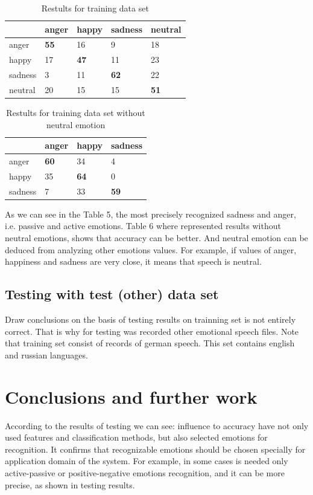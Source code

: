 \documentclass[12pt, letterpaper]{article}
\begin{document}
\begin{table}
	\centering
	\begin{tabular}{|l|l|l|l|l|}
		\hline
		&anger&happy&sadness&neutral\\ \hline
		anger&\textbf{55}&16&9&18\\\hline
		happy & 17 & \textbf{47} & 11 & 23 \\\hline
		sadness & 3 & 11 & \textbf{62} & 22\\\hline
		neutral & 20 & 15 & 15 & \textbf{51}\\\hline
		
	\end{tabular}
	\caption{Restults for training data set}
\end{table}
\begin{table}[h]
	\centering
	\begin{tabular}{|l|l|l|l|}
		\hline
		&anger&happy&sadness\\ \hline
		anger&\textbf{60}&34&4\\\hline
		happy & 35 & \textbf{64} & 0\\\hline
		sadness & 7 & 33& \textbf{59}\\\hline
		
	\end{tabular}
	\caption{Restults for training data set without neutral emotion}
\end{table}
As we can see in the Table 5, the most precisely recognized sadness and anger, i.e. passive and active emotions. Table 6 where represented results without neutral emotions, shows that accuracy can be better. And neutral emotion can be deduced from analyzing other emotions values. For example, if values of anger, happiness and sadness are very close, it means that speech is neutral.

\subsection{Testing with test (other) data set}
Draw conclusions on the basis of testing results on trainning set is not entirely correct. That is why for testing was recorded other emotional speech files. Note that training set consist of records of german speech. This set contains english and russian languages. 
\section{Conclusions and further work}
According to the results of testing we can see: influence to accuracy have not only used features and classification methods, but also selected emotions for recognition. It confirms that recognizable emotions should be chosen specially for application domain of the system. For example, in some cases is needed only active-passive or positive-negative emotions recognition, and it can be more precise, as shown in testing results.
\end{document}
